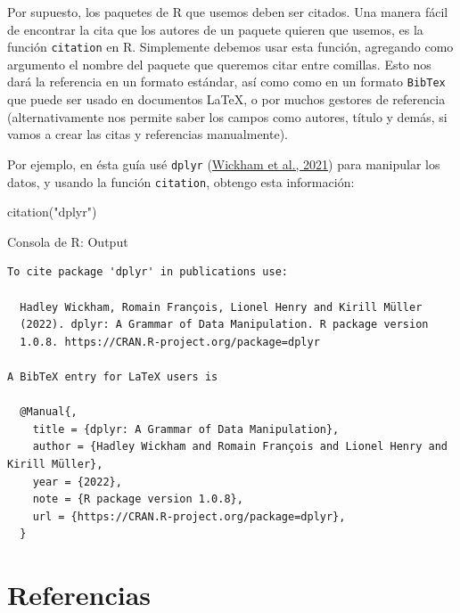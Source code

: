 \documentclass[
  bookmarksnumbered]{article}
\newenvironment{Shaded}{\begin{snugshade}}{\end{snugshade}}
\newcommand{\FunctionTok}[1]{\textcolor[rgb]{0.39,0.29,0.61}{#1}}
\newcommand{\NormalTok}[1]{\textcolor[rgb]{0.12,0.11,0.11}{#1}}
\newcommand{\StringTok}[1]{\textcolor[rgb]{0.75,0.01,0.01}{#1}}
\begin{document}
Por supuesto, los paquetes de R que usemos deben ser citados. Una manera fácil de encontrar la cita que los autores de un paquete quieren que usemos, es la función \texttt{citation} en R. Simplemente debemos usar esta función, agregando como argumento el nombre del paquete que queremos citar entre comillas. Esto nos dará la referencia en un formato estándar, así como como en un formato \texttt{BibTex} que puede ser usado en documentos \LaTeX, o por muchos gestores de referencia (alternativamente nos permite saber los campos como autores, título y demás, si vamos a crear las citas y referencias manualmente).

Por ejemplo, en ésta guía usé \texttt{dplyr} (\protect\hyperlink{ref-WickhamDplyr2021}{Wickham et al., 2021}) para manipular los datos, y usando la función \texttt{citation}, obtengo esta información:

\begin{Shaded}
\begin{Highlighting}[]
\FunctionTok{citation}\NormalTok{(}\StringTok{"dplyr"}\NormalTok{)}
\end{Highlighting}
\end{Shaded}

\begin{ROut}{Consola de R: Output~\thetcbcounter}
                \begin{footnotesize}
                \begin{verbatim} 
To cite package 'dplyr' in publications use:

  Hadley Wickham, Romain François, Lionel Henry and Kirill Müller
  (2022). dplyr: A Grammar of Data Manipulation. R package version
  1.0.8. https://CRAN.R-project.org/package=dplyr

A BibTeX entry for LaTeX users is

  @Manual{,
    title = {dplyr: A Grammar of Data Manipulation},
    author = {Hadley Wickham and Romain François and Lionel Henry and Kirill Müller},
    year = {2022},
    note = {R package version 1.0.8},
    url = {https://CRAN.R-project.org/package=dplyr},
  }
 \end{verbatim}
                \end{footnotesize}
                \end{ROut}

\newpage

\hypertarget{referencias}{%
\section*{Referencias}\label{referencias}}
\end{document}
